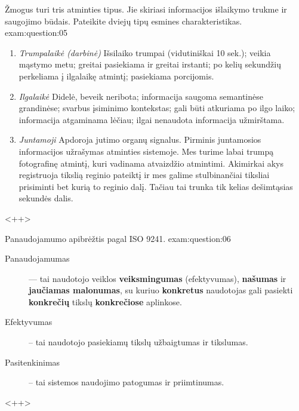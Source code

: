 \begin{question}{%
  Žmogus turi tris atminties tipus. Jie skiriasi informacijos išlaikymo
  trukme ir saugojimo būdais. Pateikite dviejų tipų esmines
  charakteristikas.
  }{exam:question:05}
  \begin{enumerate}
    \item \emph{Trumpalaikė (darbinė)} Išsilaiko trumpai (vidutiniškai 10 sek.); 
      veikia mąstymo metu; greitai pasiekiama ir greitai irstanti; po kelių sekundžių 
      perkeliama į ilgalaikę atmintį; pasiekiama porcijomis.
    \item \emph{Ilgalaikė} Didelė, beveik neribota; informacija saugoma semantinėse
      grandinėse; svarbus įsiminimo kontekstas; gali būti atkuriama po ilgo laiko;
      informacija atgaminama lėčiau; ilgai nenaudota informacija užmirštama.
    \item \emph{Juntamoji} Apdoroja jutimo organų signalus. Pirminis juntamosios 
      informacijos užrašymas atminties sistemoje. Mes turime labai trumpą fotografinę 
      atmintį, kuri vadinama atvaizdžio atmintimi. Akimirkai akys registruoja tikslią
      reginio pateiktį ir mes galime stulbinančiai tiksliai prisiminti bet kurią to 
      reginio dalį. Tačiau tai trunka tik kelias dešimtąsias sekundės dalis.
  \end{enumerate}
  <++>
\end{question}

\begin{question}{%
  Panaudojamumo apibrėžtis pagal ISO 9241.
  }{exam:question:06}
  \begin{description}
    \item[Panaudojamumas] — tai naudotojo veiklos \textbf{veiksmingumas} (efektyvumas),
      \textbf{našumas} ir \textbf{jaučiamas malonumas}, su kuriuo \textbf{konkretus} 
      naudotojas gali pasiekti \textbf{konkrečių} tikslų \textbf{konkrečiose} aplinkose.
    \item[Efektyvumas] – tai naudotojo pasiekiamų tikslų užbaigtumas ir tikslumas.
    \item[Pasitenkinimas] – tai sistemos naudojimo patogumas ir priimtinumas.
  \end{description}
  <++>
\end{question}


